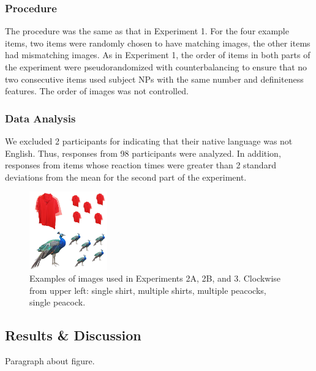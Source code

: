 \documentclass[10pt,letterpaper]{article}
\begin{document}
\subsubsection{Procedure} \quad The procedure was the same as that in Experiment 1. For the four example items, two items were randomly chosen to have matching images, the other items had mismatching images. As in Experiment 1, the order of items in both parts of the experiment were pseudorandomized with counterbalancing to ensure that no two consecutive items used subject NPs with the same number and definiteness features. The order of images was not controlled.

\subsubsection{Data Analysis} \quad We excluded 2 participants for indicating that their native language was not English. Thus, responses from 98 participants were analyzed. In addition, responses from items whose reaction times were greater than 2 standard deviations from the mean for the second part of the experiment.

\begin{figure}[t]
\begin{center}
\includegraphics[width=0.3\textwidth]{sample_images.jpg}
\end{center}
\caption{Examples of images used in Experiments 2A, 2B, and 3. Clockwise from upper left: single shirt, multiple shirts, multiple peacocks, single peacock.} 
\label{sample-figure}
\end{figure}

\subsection{Results \& Discussion}

Paragraph about figure.
\end{document}
